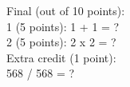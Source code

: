 \documentclass{article}
\date{\vspace{-10ex}}
\begin{document}
$ $ \\
Final (out of 10 points): \\
1 (5 points): 1 + 1 = ? \\
2 (5 points): 2 x 2 = ? \\
Extra credit (1 point): \\
568 / 568 = ?
\end{document}
